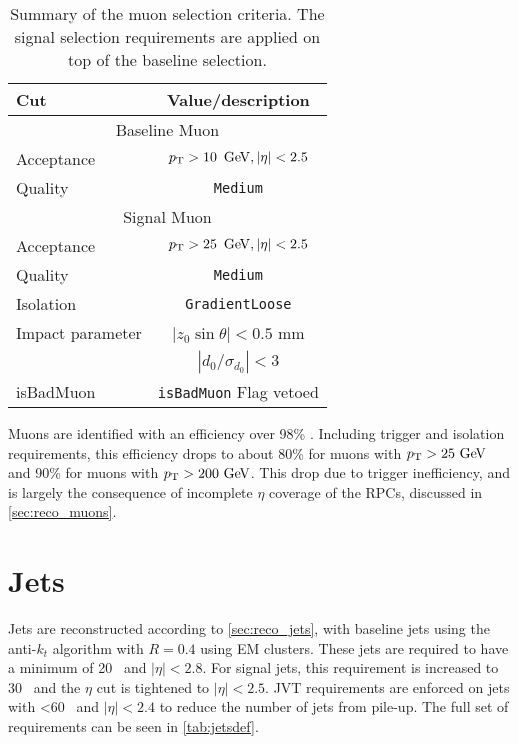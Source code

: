 \begin{table}[ph!]
  \begin{center}
    \begin{tabular}{l|c}
      \hline
      Cut            & Value/description \\
      \hline
      \hline
      \multicolumn{2}{c}{Baseline Muon}\\
      \hline
      Acceptance     & $\pt > 10\,\GeV, |\eta| < 2.5$ \\
      Quality        & \texttt{Medium}    \\
      \hline
      \multicolumn{2}{c}{Signal Muon}\\
      \hline
      Acceptance     & $\pt > 25\,\GeV, |\eta| < 2.5$ \\
      Quality        & \texttt{Medium}    \\
      Isolation        & \texttt{GradientLoose} \\
      Impact parameter & $|z_0 \sin\theta|< 0.5$ mm \\
                       & $|d_0/\sigma_{d_0}|< 3$ \\ 
      isBadMuon        & \texttt{isBadMuon} Flag vetoed \\
      \hline		  
      \hline
    \end{tabular}
  \caption{Summary of the muon selection criteria. The signal selection requirements are applied on top of the baseline selection.}            
    \label{tab:muondef}
  \end{center}
\end{table}

Muons are identified with an efficiency over 98\% \cite{PERF-2015-10}. Including trigger and isolation requirements, this efficiency drops to about 80\% for muons with $\pt>25\gev$ and 90\% for muons with $\pt>200\gev$. This drop due to trigger inefficiency, and is largely the consequence of incomplete $\eta$ coverage of the \acp{RPC}, discussed in \autoref{sec:reco_muons}. %

\section{Jets}

Jets are reconstructed according to \autoref{sec:reco_jets}, with baseline jets using the anti-$k_t$ algorithm with $R=0.4$ using \ac{EM} clusters. These jets are required to have a minimum \pt of 20 \gev~and $|\eta|<2.8$. For signal jets, this \pt requirement is increased to 30 \gev~and the $\eta$ cut is tightened to $|\eta|<2.5$. \ac{JVT} requirements are enforced on jets with \pt<60 \gev~and $|\eta|<2.4$ to reduce the number of jets from pile-up. The full set of requirements can be seen in \autoref{tab:jetsdef}.

